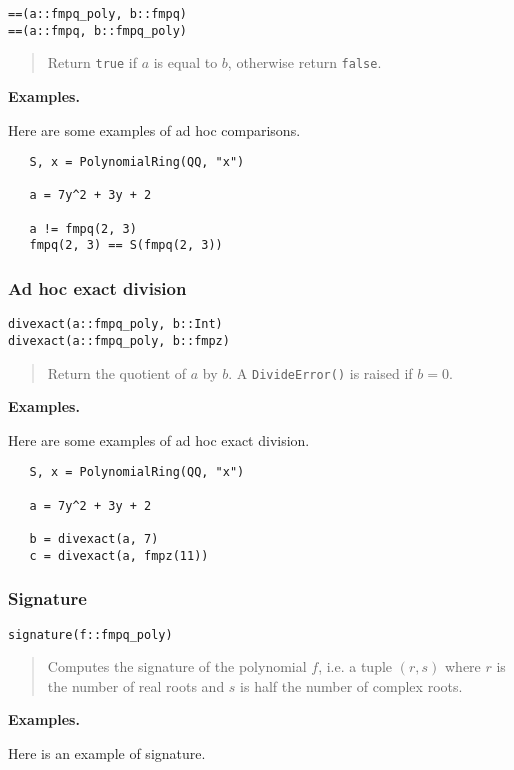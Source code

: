 \documentclass[a4paper,10pt]{article}
\newcommand{\code}{\lstinline}
\newcommand{\desc}[1]{\vspace{-3mm}\begin{quote}#1\end{quote}}
\begin{document}
{{\begin{lstlisting}
==(a::fmpq_poly, b::fmpq)
==(a::fmpq, b::fmpq_poly)
\end{lstlisting}

\desc{Return \code{true} if $a$ is equal to $b$, otherwise return \code{false}.}

\textbf{Examples.}

Here are some examples of ad hoc comparisons.

\begin{lstlisting}
   S, x = PolynomialRing(QQ, "x")

   a = 7y^2 + 3y + 2

   a != fmpq(2, 3)
   fmpq(2, 3) == S(fmpq(2, 3))
\end{lstlisting}

\subsubsection{Ad hoc exact division}

\begin{lstlisting}
divexact(a::fmpq_poly, b::Int)
divexact(a::fmpq_poly, b::fmpz)
\end{lstlisting}

\desc{Return the quotient of $a$ by $b$. A \code{DivideError()} is raised if $b = 0$.}

\textbf{Examples.}

Here are some examples of ad hoc exact division.

\begin{lstlisting}
   S, x = PolynomialRing(QQ, "x")

   a = 7y^2 + 3y + 2

   b = divexact(a, 7)
   c = divexact(a, fmpz(11))
\end{lstlisting}

\subsubsection{Signature}

\begin{lstlisting}
signature(f::fmpq_poly)
\end{lstlisting}

\desc{Computes the signature of the polynomial $f$, i.e. a tuple $(r, s)$ where $r$ is
the number of real roots and $s$ is half the number of complex roots.}

\textbf{Examples.}

Here is an example of signature.

}}
\end{document}
